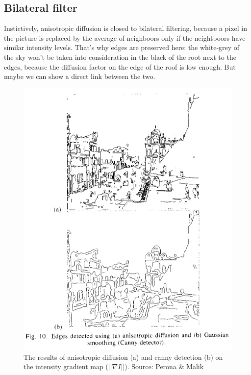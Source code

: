 \documentclass[12pt,a4paper]{article}
\begin{document}
\subsection{Bilateral filter}

Instictively, anisotropic diffusion is closed to bilateral filtering, because a pixel in the picture is replaced by the average of neighboors only if the neightboors have similar intensity levels. That's why edges are preserved here: the white-grey of the sky won't be taken into consideration in the black of the root next to the edges, because the diffusion factor on the edge of the roof is low enough.
But maybe we can show a direct link between the two.

\begin{figure}[h]
	\centering
	\includegraphics[scale=0.5]{EdgeEnhancement_Example.png}
	\caption{The results of anisotropic diffusion (a) and canny detection (b) on the intensity gradient map ($||\nabla I||$). Source: Perona \& Malik}	
\end{figure}
\end{document}
